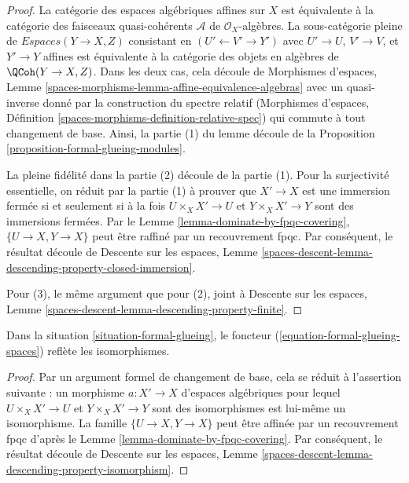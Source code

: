 \begin{proof}
La catégorie des espaces algébriques affines sur $X$ est équivalente à la
catégorie des faisceaux quasi-cohérents $\mathcal{A}$ de $\mathcal{O}_X$-algèbres.
La sous-catégorie pleine de $\textit{Espaces}(Y \to X, Z)$ consistant en
$(U' \leftarrow V' \rightarrow Y')$ avec $U' \to U$, $V' \to V$,
et $Y' \to Y$ affines est équivalente à la catégorie des
objets en algèbres de $\QCoh(Y \to X, Z)$. Dans les deux cas, cela découle
de Morphismes d'espaces, Lemme
\ref{spaces-morphisms-lemma-affine-equivalence-algebras}
avec un quasi-inverse donné par la construction du spectre relatif
(Morphismes d'espaces, Définition
\ref{spaces-morphisms-definition-relative-spec})
qui commute à tout changement de base. Ainsi, la partie (1) du
lemme découle de la Proposition \ref{proposition-formal-glueing-modules}.

\medskip\noindent
La pleine fidélité dans la partie (2) découle de la partie (1). Pour la surjectivité essentielle, on réduit par la partie (1) à prouver que $X' \to X$ est une immersion fermée si et seulement si à la fois $U \times_X X' \to U$ et $Y \times_X X' \to Y$ sont des immersions fermées. Par le Lemme \ref{lemma-dominate-by-fpqc-covering}, $\{U \to X, Y \to X\}$ peut être raffiné par un recouvrement fpqc. Par conséquent, le résultat découle de Descente sur les espaces, Lemme \ref{spaces-descent-lemma-descending-property-closed-immersion}.

\medskip\noindent
Pour (3), le même argument que pour (2), joint à
Descente sur les espaces, Lemme
\ref{spaces-descent-lemma-descending-property-finite}.
\end{proof}

\begin{lemma}
\label{lemma-reflects-isomorphisms}
Dans la situation \ref{situation-formal-glueing}, le foncteur
(\ref{equation-formal-glueing-spaces}) reflète les isomorphismes.
\end{lemma}

\begin{proof}
Par un argument formel de changement de base, cela se réduit à l'assertion suivante : un morphisme $a : X' \to X$ d'espaces algébriques pour lequel $U \times_X X' \to U$ et $Y \times_X X' \to Y$ sont des isomorphismes est lui-même un isomorphisme. La famille $\{U \to X, Y \to X\}$ peut être affinée par un recouvrement fpqc d'après le Lemme \ref{lemma-dominate-by-fpqc-covering}. 
Par conséquent, le résultat découle de
Descente sur les espaces, Lemme \ref{spaces-descent-lemma-descending-property-isomorphism}.
\end{proof}

